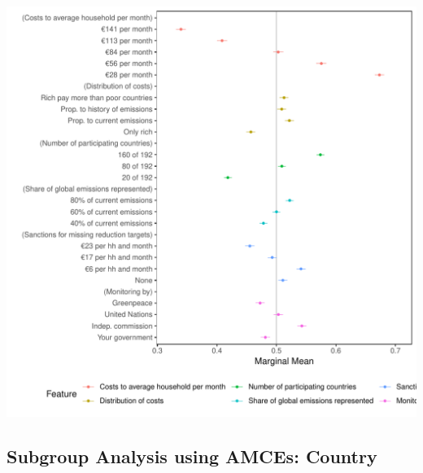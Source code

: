 \documentclass[a4paper,12pt]{article}\usepackage[]{graphicx}\usepackage[]{color}
\makeatletter
\def\maxwidth{ %
  \ifdim\Gin@nat@width>\linewidth
    \linewidth
  \else
    \Gin@nat@width
  \fi
}
\newenvironment{knitrout}{}{} %
\makeatother
\begin{document}
\begin{knitrout}
\color{fgcolor}
\includegraphics[width=\maxwidth]{figure/bechtel_mm-1} 

\end{knitrout}

\clearpage




\clearpage

\subsection{Subgroup Analysis using AMCEs: Country}
\end{document}
